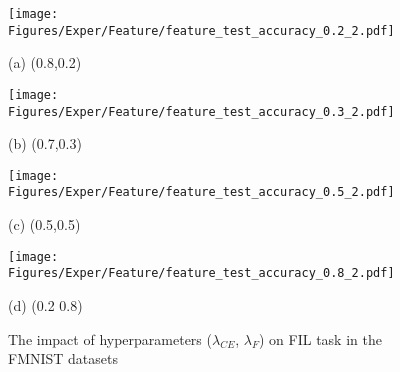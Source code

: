 \begin{figure}[!t] 
	\begin{minipage}{0.48\linewidth}
    \centerline{\texttt{[image: Figures/Exper/Feature/feature\_test\_accuracy\_0.2\_2.pdf]}}
		\centerline{(a) (0.8,0.2)}
	\end{minipage}
    \begin{minipage}{0.48\linewidth}
    \centerline{\texttt{[image: Figures/Exper/Feature/feature\_test\_accuracy\_0.3\_2.pdf]}}
		\centerline{(b) (0.7,0.3)}
	\end{minipage}
    
    \begin{minipage}{0.48\linewidth}
\centerline{\texttt{[image: Figures/Exper/Feature/feature\_test\_accuracy\_0.5\_2.pdf]}}
		\centerline{(c) (0.5,0.5)}
	\end{minipage}
	\begin{minipage}{0.48\linewidth}
    \centerline{\texttt{[image: Figures/Exper/Feature/feature\_test\_accuracy\_0.8\_2.pdf]}}
		\centerline{(d) (0.2 0.8)}
	\end{minipage}
	\caption{The impact of hyperparameters ($\lambda_{CE}$, $\lambda_{F}$) on FIL task in the FMNIST datasets}
	\label{Fig: hyperparameter}
\end{figure}



